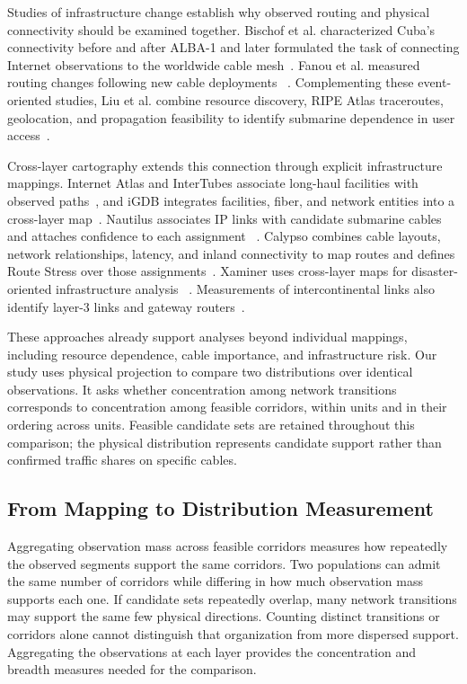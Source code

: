 Studies of infrastructure change establish why observed routing and
physical connectivity should be examined together. Bischof et al.
characterized Cuba's connectivity before and after ALBA-1 and later
formulated the task of connecting Internet observations to the worldwide
cable mesh~\cite{bischof2015cuba,bischof2018untangling}. Fanou et al.
measured routing changes following new cable deployments
~\cite{fanou2020unintended}. Complementing these event-oriented studies,
Liu et al. combine resource discovery, RIPE Atlas traceroutes, geolocation,
and propagation feasibility to identify submarine dependence in user
access~\cite{liu2020outofsight}.

Cross-layer cartography extends this connection through explicit
infrastructure mappings. Internet Atlas and InterTubes associate long-haul
facilities with observed paths~\cite{durairajan2013atlas,durairajan2015intertubes},
and iGDB integrates facilities, fiber, and network entities into a cross-layer
map~\cite{anderson2022igdb}. Nautilus associates IP links with candidate
submarine cables and attaches confidence to each assignment
~\cite{ramanathan2023nautilus}. Calypso combines cable layouts, network
relationships, latency, and inland connectivity to map routes and defines
Route Stress over those assignments~\cite{wang2025calypso}. Xaminer uses
cross-layer maps for disaster-oriented infrastructure analysis
~\cite{ramanathan2024xaminer}. Measurements of intercontinental links also
identify layer-3 links and gateway routers~\cite{carisimo2023hopaway}.

These approaches already support analyses beyond individual mappings,
including resource dependence, cable importance, and infrastructure risk.
Our study uses physical projection to compare two distributions over
identical observations. It asks whether concentration among network
transitions corresponds to concentration among feasible corridors, within
units and in their ordering across units. Feasible candidate sets are
retained throughout this comparison; the physical distribution represents
candidate support rather than confirmed traffic shares on specific cables.

\subsection{From Mapping to Distribution Measurement}
\label{sec:background_motivation}

Aggregating observation mass across feasible corridors measures how
repeatedly the observed segments support the same corridors. Two populations
can admit the same number of
corridors while differing in how much observation mass supports each one.
If candidate sets repeatedly overlap, many network transitions may support
the same few physical directions. Counting distinct transitions or corridors
alone cannot distinguish that organization from more dispersed support.
Aggregating the observations at each layer provides the concentration and
breadth measures needed for the comparison.

